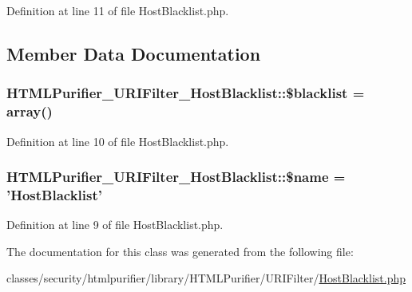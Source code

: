 Definition at line 11 of file Host\+Blacklist.\+php.



\subsection{Member Data Documentation}
\hypertarget{classHTMLPurifier__URIFilter__HostBlacklist_a59195baa7b4bf4c371a1201a589ca4a6}{
\subsubsection[{\$blacklist}]{\setlength{\rightskip}{0pt plus 5cm}H\+T\+M\+L\+Purifier\+\_\+\+U\+R\+I\+Filter\+\_\+\+Host\+Blacklist\+::\$blacklist = array()\hspace{0.3cm}{\ttfamily [protected]}}}\label{classHTMLPurifier__URIFilter__HostBlacklist_a59195baa7b4bf4c371a1201a589ca4a6}


Definition at line 10 of file Host\+Blacklist.\+php.

\hypertarget{classHTMLPurifier__URIFilter__HostBlacklist_ade87a3cc9253685aa49b2d74347e1819}{
\subsubsection[{\$name}]{\setlength{\rightskip}{0pt plus 5cm}H\+T\+M\+L\+Purifier\+\_\+\+U\+R\+I\+Filter\+\_\+\+Host\+Blacklist\+::\$name = 'Host\+Blacklist'}}\label{classHTMLPurifier__URIFilter__HostBlacklist_ade87a3cc9253685aa49b2d74347e1819}


Definition at line 9 of file Host\+Blacklist.\+php.



The documentation for this class was generated from the following file\+:\begin{DoxyCompactItemize}
\item 
classes/security/htmlpurifier/library/\+H\+T\+M\+L\+Purifier/\+U\+R\+I\+Filter/\hyperlink{HostBlacklist_8php}{Host\+Blacklist.\+php}\end{DoxyCompactItemize}
